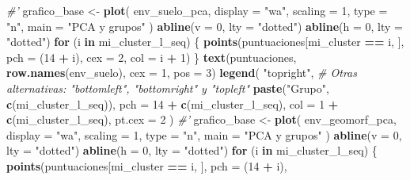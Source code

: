 \documentclass[11pt,]{article}
\newenvironment{Shaded}{\begin{snugshade}}{\end{snugshade}}
\newcommand{\KeywordTok}[1]{\textcolor[rgb]{0.13,0.29,0.53}{\textbf{#1}}}
\newcommand{\DataTypeTok}[1]{\textcolor[rgb]{0.13,0.29,0.53}{#1}}
\newcommand{\DecValTok}[1]{\textcolor[rgb]{0.00,0.00,0.81}{#1}}
\newcommand{\StringTok}[1]{\textcolor[rgb]{0.31,0.60,0.02}{#1}}
\newcommand{\CommentTok}[1]{\textcolor[rgb]{0.56,0.35,0.01}{\textit{#1}}}
\newcommand{\ControlFlowTok}[1]{\textcolor[rgb]{0.13,0.29,0.53}{\textbf{#1}}}
\newcommand{\OperatorTok}[1]{\textcolor[rgb]{0.81,0.36,0.00}{\textbf{#1}}}
\newcommand{\NormalTok}[1]{#1}
\begin{document}
\begin{Shaded}
\begin{Highlighting}[]
{{{{{{{{\CommentTok{#'}
\NormalTok{grafico_base <-}\StringTok{ }\KeywordTok{plot}\NormalTok{(}
\NormalTok{  env_suelo_pca,}
  \DataTypeTok{display =} \StringTok{"wa"}\NormalTok{,}
  \DataTypeTok{scaling =} \DecValTok{1}\NormalTok{,}
  \DataTypeTok{type =} \StringTok{"n"}\NormalTok{,}
  \DataTypeTok{main =} \StringTok{"PCA y grupos"}
\NormalTok{)}
\KeywordTok{abline}\NormalTok{(}\DataTypeTok{v =} \DecValTok{0}\NormalTok{, }\DataTypeTok{lty =} \StringTok{"dotted"}\NormalTok{)}
\KeywordTok{abline}\NormalTok{(}\DataTypeTok{h =} \DecValTok{0}\NormalTok{, }\DataTypeTok{lty =} \StringTok{"dotted"}\NormalTok{)}
\ControlFlowTok{for}\NormalTok{ (i }\ControlFlowTok{in}\NormalTok{ mi_cluster_l_seq) \{}
  \KeywordTok{points}\NormalTok{(puntuaciones[mi_cluster }\OperatorTok{==}\StringTok{ }\NormalTok{i, ],}
         \DataTypeTok{pch =}\NormalTok{ (}\DecValTok{14} \OperatorTok{+}\StringTok{ }\NormalTok{i),}
         \DataTypeTok{cex =} \DecValTok{2}\NormalTok{,}
         \DataTypeTok{col =}\NormalTok{ i }\OperatorTok{+}\StringTok{ }\DecValTok{1}\NormalTok{)}
\NormalTok{\}}
\KeywordTok{text}\NormalTok{(puntuaciones, }\KeywordTok{row.names}\NormalTok{(env_suelo), }\DataTypeTok{cex =} \DecValTok{1}\NormalTok{, }\DataTypeTok{pos =} \DecValTok{3}\NormalTok{)}
\KeywordTok{legend}\NormalTok{(}
  \StringTok{"topright"}\NormalTok{, }\CommentTok{# Otras alternativas: "bottomleft", "bottomright" y "topleft"}
  \KeywordTok{paste}\NormalTok{(}\StringTok{"Grupo"}\NormalTok{, }\KeywordTok{c}\NormalTok{(mi_cluster_l_seq)),}
  \DataTypeTok{pch =} \DecValTok{14} \OperatorTok{+}\StringTok{ }\KeywordTok{c}\NormalTok{(mi_cluster_l_seq),}
  \DataTypeTok{col =} \DecValTok{1} \OperatorTok{+}\StringTok{ }\KeywordTok{c}\NormalTok{(mi_cluster_l_seq),}
  \DataTypeTok{pt.cex =} \DecValTok{2}
\NormalTok{)}
\CommentTok{#' }
\NormalTok{grafico_base <-}\StringTok{ }\KeywordTok{plot}\NormalTok{(}
\NormalTok{  env_geomorf_pca,}
  \DataTypeTok{display =} \StringTok{"wa"}\NormalTok{,}
  \DataTypeTok{scaling =} \DecValTok{1}\NormalTok{,}
  \DataTypeTok{type =} \StringTok{"n"}\NormalTok{,}
  \DataTypeTok{main =} \StringTok{"PCA y grupos"}
\NormalTok{)}
\KeywordTok{abline}\NormalTok{(}\DataTypeTok{v =} \DecValTok{0}\NormalTok{, }\DataTypeTok{lty =} \StringTok{"dotted"}\NormalTok{)}
\KeywordTok{abline}\NormalTok{(}\DataTypeTok{h =} \DecValTok{0}\NormalTok{, }\DataTypeTok{lty =} \StringTok{"dotted"}\NormalTok{)}
\ControlFlowTok{for}\NormalTok{ (i }\ControlFlowTok{in}\NormalTok{ mi_cluster_l_seq) \{}
  \KeywordTok{points}\NormalTok{(puntuaciones[mi_cluster }\OperatorTok{==}\StringTok{ }\NormalTok{i, ],}
         \DataTypeTok{pch =}\NormalTok{ (}\DecValTok{14} \OperatorTok{+}\StringTok{ }\NormalTok{i),}
}}}}}}}}
\end{Highlighting}
\end{Shaded}
\end{document}

